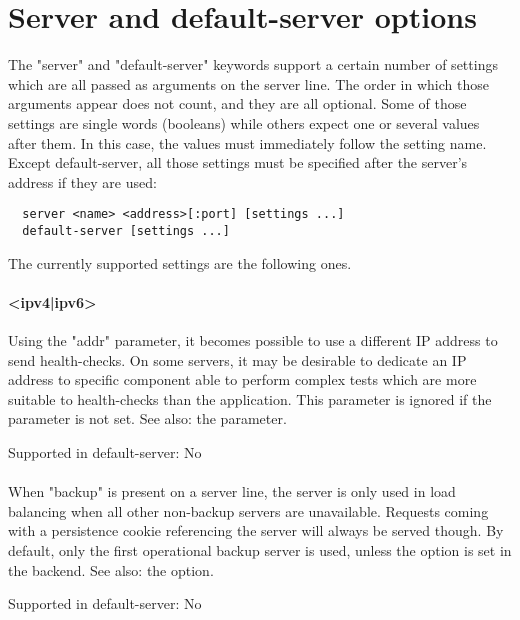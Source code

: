 \chapter{Server and default-server options}
\label{chap:server_options}

The "server" and "default-server" keywords support a certain number of settings
which are all passed as arguments on the server line. The order in which those
arguments appear does not count, and they are all optional. Some of those
settings are single words (booleans) while others expect one or several values
after them. In this case, the values must immediately follow the setting name.
Except default-server, all those settings must be specified after the server's
address if they are used:

\begin{verbatim}
  server <name> <address>[:port] [settings ...]
  default-server [settings ...]
\end{verbatim}

The currently supported settings are the following ones.

\subsubsection[addr]{ <ipv4|ipv6>}
  Using the "addr" parameter, it becomes possible to use a different IP address
  to send health-checks. On some servers, it may be desirable to dedicate an IP
  address to specific component able to perform complex tests which are more
  suitable to health-checks than the application. This parameter is ignored if
  the  parameter is not set. See also: the  parameter.

  Supported in default-server: No

\subsubsection[backup]{}
  When "backup" is present on a server line, the server is only used in load
  balancing when all other non-backup servers are unavailable. Requests coming
  with a persistence cookie referencing the server will always be served
  though. By default, only the first operational backup server is used, unless
  the  option is set in the backend. See also: the 
  option.

  Supported in default-server: No

